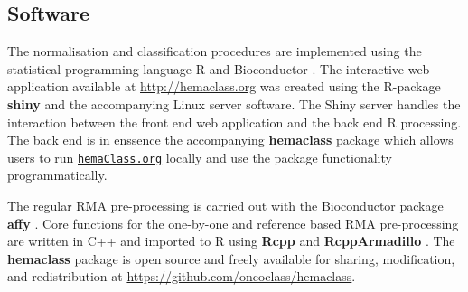 \documentclass{article}
\newcommand{\hemaClass}{\href{http://hemaClass.org}{\texttt{hemaClass.org}}}
\newcommand{\R}{\textsf{R}}
\newcommand{\pkg}[1]{\textbf{#1}}
\begin{document}
\subsection{Software}
The normalisation and classification procedures are implemented using the statistical programming language \R{} \citep{RCoreTeam} and Bioconductor \citep{Gentleman2004}.
The interactive web application available at \url{http://hemaclass.org} was created using the \R{}-package \pkg{shiny} \citep{RStudio2013} and the accompanying Linux server software.
The Shiny server handles the interaction between the front end web application and the back end \R{} processing.
The back end is in enssence the accompanying \pkg{hemaclass} package which allows users to run \hemaClass{} locally and use the package functionality programmatically.

The regular RMA pre-processing is carried out with the Bioconductor package \pkg{affy} \citep{Gautier2004}.
Core functions for the one-by-one and reference based RMA pre-processing are written in \textsf{C++} and imported to \R{} using \pkg{Rcpp} and \pkg{RcppArmadillo} \citep{Rcpp2013,Eddelbuettel2011,RcppArmadillo,Sanderson2010}.
The \pkg{hemaclass} package is open source and freely available for sharing, modification, and redistribution at \url{https://github.com/oncoclass/hemaclass}.
\end{document}
